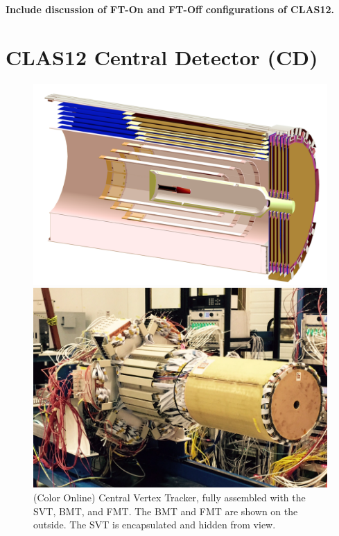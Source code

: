 \documentclass[final,3p,twocolumn]{elsarticle}
\begin{document}
{\bf Include discussion of FT-On and FT-Off configurations of CLAS12.}

\section{CLAS12 Central Detector (CD)} 
\begin{figure}[htbp!]
\centerline{\includegraphics[width=1.0\columnwidth]{CVT-schematics.png}}
\caption{ \rm Central Vertex Tracker schematics, showing (from the inside) the target cell and vacuum chambers, the 3 double layers of the SVT, followed by the 6 layers of BMT. The beam enters from the left.  The six FMT layers are shown at the downstream end at the 
right. }
\label{CVT}
\vspace{1.0cm}
\centerline{\includegraphics[width=1.0\columnwidth]{CVT.png}}
\caption{(Color Online) Central Vertex Tracker, fully assembled with the SVT, BMT, and FMT. The BMT and FMT are shown on the
outside. The SVT is encapsulated and hidden from view.}
\label{CVT}
\end{figure}
\end{document}
